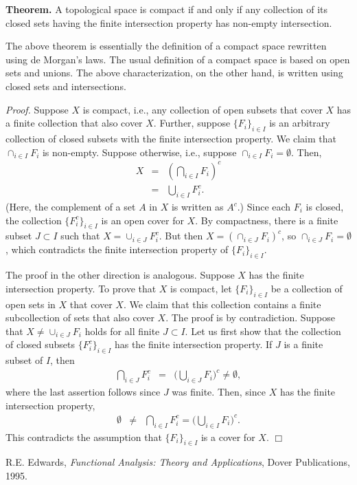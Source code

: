 \documentclass[12pt]{article}
\begin{document}
{\bf Theorem. }
A topological space is compact if and only if any collection of its closed sets having the finite intersection property has non-empty intersection.

The above theorem is essentially
the definition of a compact space rewritten using de Morgan's laws.
The usual definition of a compact space is based on open sets and 
unions. The above characterization, on the other hand, is written 
using closed sets and intersections. 

\emph{Proof.} Suppose $X$ is compact, i.e., any collection of open subsets
that cover $X$ has a finite collection that also cover $X$. Further, suppose
$\{F_i\}_{i\in I}$ is an arbitrary collection of closed subsets
with the finite intersection property. We claim that $\cap_{i\in I} F_i$
is non-empty. 
Suppose otherwise, i.e., suppose $\cap_{i\in I} F_i=\emptyset$. Then, 
\begin{eqnarray*}
X&=&\left(\bigcap_{i\in I} F_i\right)^c\\
 &=&\bigcup_{i\in I} F_i^c.
\end{eqnarray*}
(Here, the complement of a set $A$ in $X$ is written as $A^c$.)
Since each $F_i$ is closed, the collection $\{F_i^c\}_{i\in I}$
is an open cover for $X$. By compactness, there is  a 
finite subset $J\subset I$ such
that $X=\cup_{i\in J} F_i^c$. But then 
$X=(\cap_{i\in J} F_i)^c$, so $\cap_{i\in J} F_i=\emptyset$, which 
contradicts the finite intersection property of $\{F_i\}_{i\in I}$. 

The proof in the other direction is analogous. 
Suppose $X$ has the finite intersection property.
To prove that
$X$ is compact, let $\{F_i\}_{i\in I}$ be a collection of open sets
in $X$ that cover $X$. We claim that this collection contains a finite subcollection
of sets that also cover $X$. 
The proof is by contradiction. 
Suppose
that $X\neq \cup_{i\in J} F_i$ holds for all finite $J\subset I$.
Let us first show that the collection of closed subsets 
$\{F_i^c\}_{i\in I}$ has the finite intersection property. 
If $J$ is a finite subset of $I$, then 
\begin{eqnarray*}
\bigcap_{i\in J} F^c_i &=& \Big(\bigcup_{i\in J} F_i\Big)^c \neq \emptyset,
\end{eqnarray*}
where the last assertion follows since $J$ was finite. 
Then, since $X$ has the finite intersection property, 
\begin{eqnarray*}
\emptyset &\neq& \bigcap_{i\in I} F_i^c = \Big(\bigcup_{i\in I} F_i\Big)^c.
\end{eqnarray*}
This contradicts the assumption that $\{F_i\}_{i\in I}$ is a cover for $X$. 
$\Box$

\begin{thebibliography}{9}
 R.E. Edwards, \emph{Functional Analysis: Theory and Applications}, Dover Publications, 1995.
\end{thebibliography}
\end{document}
